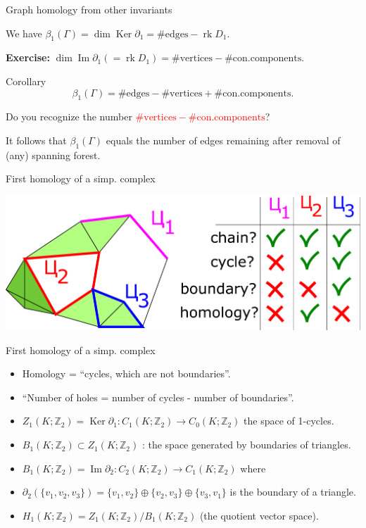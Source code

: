 \documentclass[10pt]{beamer}
\DeclareMathOperator{\Ker}{Ker}
\DeclareMathOperator{\Imm}{Im}
\DeclareMathOperator{\rk}{rk}
\newcommand{\Zo}{\mathbb{Z}}
\newcommand{\Zt}{\Zo_2}
\newcommand{\dd}{\partial}
\begin{document}
\begin{frame}{Graph homology from other invariants}

We have $\beta_1(\Gamma)=\dim\Ker\dd_1=\#\mbox{edges}-\rk D_1$.

\textbf{Exercise:} $\dim \Imm\dd_1 (=\rk D_1)=\#\mbox{vertices}-\#\mbox{con.components}$.

\begin{block}{Corollary}
\[
\beta_1(\Gamma)=\#\mbox{edges}-\#\mbox{vertices}+\#\mbox{con.components}.
\]
\end{block}

Do you recognize the number \textcolor{red}{$\#\mbox{vertices}-\#\mbox{con.components}$}? \pause

It follows that $\beta_1(\Gamma)$ equals the number of edges remaining after removal of (any) spanning forest.
\end{frame}

\begin{frame}{First homology of a simp. complex}
\pause

\begin{center}
\includegraphics[scale=0.3]{pictures/cycles1.pdf}
\end{center}

\end{frame}

\begin{frame}{First homology of a simp. complex}

\begin{itemize}
  \item Homology = ``cycles, which are not boundaries''.
  \item ``Number of holes = number of cycles - number of boundaries''.\pause
  \item $Z_1(K;\Zt)=\Ker\dd_1\colon C_1(K;\Zt)\to C_0(K;\Zt)$ the space of 1-cycles.
  \item $B_1(K;\Zt)\subset Z_1(K;\Zt)$ : the space generated by boundaries of triangles.\pause
  \item $B_1(K;\Zt)=\Imm\dd_2\colon C_2(K;\Zt)\to C_1(K;\Zt)$ where
  \item $\dd_2(\{v_1,v_2,v_3\})=\{v_1,v_2\}\oplus\{v_2,v_3\}\oplus \{v_3,v_1\}$ is the boundary of a triangle.
  \item $H_1(K;\Zt)=Z_1(K;\Zt)/B_1(K;\Zt)$ (the quotient vector space).
\end{itemize}

\end{frame}
\end{document}
